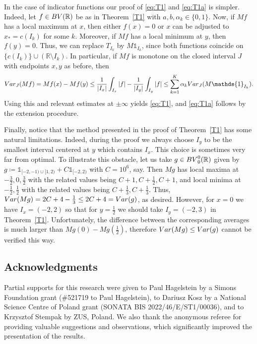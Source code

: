 \documentclass[leqno,11pt]{amsart}
\numberwithin{equation}{section}
\numberwithin{theorem}{section}
\newcommand{\RR}{\mathbb{R}}
\newcommand{\Var}{{\rm Var}}
\newcommand{\BV}{{\rm BV}}
\newcommand{\ind}[1]{{\mathds{1}_{{#1}}}}
\begin{document}
In the case of indicator functions our proof of \eqref{eq:T1} and \eqref{eq:T1a} is simpler. Indeed, let $f \in \BV(\RR)$ be as in Theorem~\ref{T1} with 
$a,b,\alpha_k \in \{0,1\}$. Now, if $Mf$ has a local maximum at $x$, then either $f(x)=0$ or $x$ can be adjusted to $x_* = c(I_k)$ for some $k$. 
Moreover, if $Mf$ has a local minimum at $y$, then $f(y)=0$. Thus, we can replace $T_{I_k}$ by $M \ind{I_k}$, since both functions coincide on 
$\{c(I_k)\} \cup (\RR \setminus I_k)$. In particular, if $Mf$ is monotone on the closed interval $J$ with endpoints $x, y$ as before, then
	\[
	\Var_J(Mf) = Mf(x) - Mf(y) \leq \frac{1}{|I_x|} \int_{I_x} |f| - \frac{1}{|I_y|} \int_{I_y} |f| \leq \sum_{k =1}^K \alpha_k \Var_{J} (M \ind{I_k}). 
	\]  
	Using this and relevant estimates at $\pm \infty$ yields \eqref{eq:T1}, and \eqref{eq:T1a} follows 
	by the extension procedure.

Finally, notice that the method presented in the proof of Theorem~\ref{T1} has some natural limitations. Indeed, during the proof we always choose $I_y$ to be the smallest interval centered at $y$ which contains $I_x$. This choice is sometimes very far from optimal. To illustrate this obstacle, let us take $g \in \BV_0^0(\RR)$ given by $g \coloneqq \ind{[-2,-1) \cup [1,2)} + C \ind{[-2,2)}$ with $C = 10^6$, say. Then $Mg$ has local maxima at $-\frac{3}{2}, 0, \frac{3}{2}$ with the related values being $C+1, C+\frac{1}{2}, C+1$, and local minima at $-\frac{1}{2}, \frac{1}{2}$ with the related values being $C+\frac{1}{3},C+\frac{1}{3}$. Thus, $\Var(Mg) = 2C + 4 - \frac{1}{3} \leq 2C + 4 = \Var(g)$, as desired. However, for $x = 0$ we have $I_x = (-2,2)$ so that for $y = \frac{1}{2}$ we should take $I_y = (-2,3)$ in Theorem~\ref{T1}. Unfortunately, the difference between the corresponding averages is much larger than $Mg(0) - Mg(\frac{1}{2})$, therefore $\Var(Mg) \leq \Var(g)$ cannot be verified this way.

\subsection*{Acknowledgments} Partial supports for this research were given to Paul Hagelstein by a Simons Foundation grant (\#521719 to Paul Hagelstein), to Dariusz Kosz by a National Science Centre of Poland grant (SONATA BIS 2022/46/E/ST1/00036), and to Krzysztof Stempak by ZUS, Poland.
We also thank the anonymous referee for providing valuable suggestions and observations, which significantly improved the presentation of the results.
\end{document}

